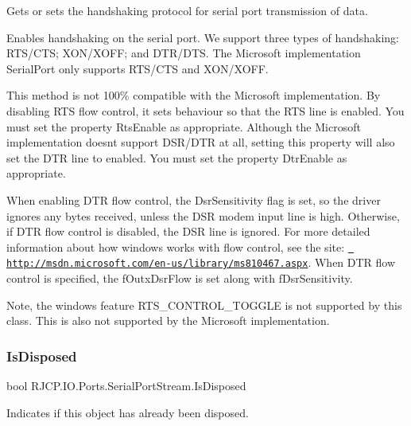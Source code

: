 Gets or sets the handshaking protocol for serial port transmission of data. 

Enables handshaking on the serial port. We support three types of handshaking\+: R\+T\+S/\+C\+TS; X\+O\+N/\+X\+O\+FF; and D\+T\+R/\+D\+TS. The Microsoft implementation Serial\+Port only supports R\+T\+S/\+C\+TS and X\+O\+N/\+X\+O\+FF. 

This method is not 100\% compatible with the Microsoft implementation. By disabling R\+TS flow control, it sets behaviour so that the R\+TS line is enabled. You must set the property Rts\+Enable as appropriate. Although the Microsoft implementation doesn\textquotesingle{}t support D\+S\+R/\+D\+TR at all, setting this property will also set the D\+TR line to enabled. You must set the property Dtr\+Enable as appropriate.

When enabling D\+TR flow control, the Dsr\+Sensitivity flag is set, so the driver ignores any bytes received, unless the D\+SR modem input line is high. Otherwise, if D\+TR flow control is disabled, the D\+SR line is ignored. For more detailed information about how windows works with flow control, see the site\+: \href{http://msdn.microsoft.com/en-us/library/ms810467.aspx}{\texttt{ http\+://msdn.\+microsoft.\+com/en-\/us/library/ms810467.\+aspx}}. When D\+TR flow control is specified, the f\+Outx\+Dsr\+Flow is set along with f\+Dsr\+Sensitivity.

Note, the windows feature R\+T\+S\+\_\+\+C\+O\+N\+T\+R\+O\+L\+\_\+\+T\+O\+G\+G\+LE is not supported by this class. This is also not supported by the Microsoft implementation.\mbox{\label{class_r_j_c_p_1_1_i_o_1_1_ports_1_1_serial_port_stream_a7c16250b2b3e6d7180d22544c7d5d318}} 
\subsubsection{\texorpdfstring{IsDisposed}{IsDisposed}}
{\footnotesize\ttfamily bool R\+J\+C\+P.\+I\+O.\+Ports.\+Serial\+Port\+Stream.\+Is\+Disposed\hspace{0.3cm}{\ttfamily [get]}}



Indicates if this object has already been disposed. 

\mbox{\label{class_r_j_c_p_1_1_i_o_1_1_ports_1_1_serial_port_stream_a45f781900a7c7f68361e71ee8b4965e5}} 
